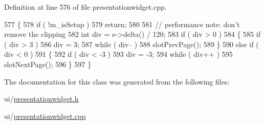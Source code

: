 Definition at line 576 of file presentationwidget.\+cpp.


\begin{DoxyCode}
577 \{
578     \textcolor{keywordflow}{if} ( !m\_isSetup )
579         \textcolor{keywordflow}{return};
580 
581     \textcolor{comment}{// performance note: don't remove the clipping}
582     \textcolor{keywordtype}{int} div = e->delta() / 120;
583     \textcolor{keywordflow}{if} ( div > 0 )
584     \{
585         \textcolor{keywordflow}{if} ( div > 3 )
586             div = 3;
587         \textcolor{keywordflow}{while} ( div-- )
588             slotPrevPage();
589     \}
590     \textcolor{keywordflow}{else} \textcolor{keywordflow}{if} ( div < 0 )
591     \{
592         \textcolor{keywordflow}{if} ( div < -3 )
593             div = -3;
594         \textcolor{keywordflow}{while} ( div++ )
595             slotNextPage();
596     \}
597 \}
\end{DoxyCode}


The documentation for this class was generated from the following files\+:\begin{DoxyCompactItemize}
\item 
ui/\hyperlink{presentationwidget_8h}{presentationwidget.\+h}\item 
ui/\hyperlink{presentationwidget_8cpp}{presentationwidget.\+cpp}\end{DoxyCompactItemize}
